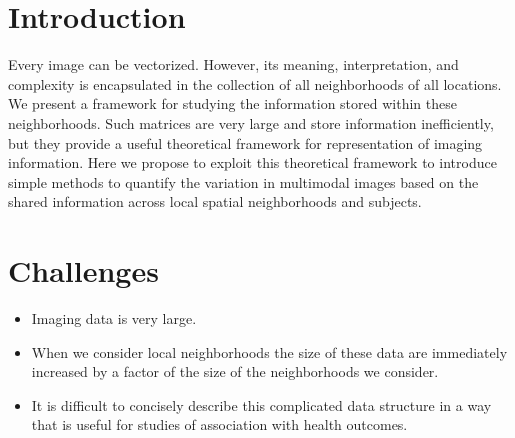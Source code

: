 \documentclass[a0,landscape]{a0poster}
\begin{document}
\begin{multicols}{3}
\color{black} %
\large{\section*{\color{uwred}Introduction}}
\noindent Every image can be vectorized. However, its meaning, interpretation, and complexity is encapsulated in the collection of all neighborhoods of all locations. We present a framework for studying the information stored within these neighborhoods. Such  matrices are very large and store information inefficiently, but they provide a useful theoretical framework for representation of imaging information. Here we propose to exploit this theoretical framework to introduce simple methods to quantify the variation in multimodal images based on the shared information across local spatial neighborhoods and subjects.
{\section*{\color{uwred}Challenges}}
\begin{itemize}
\item  Imaging data is very large.
\item When we consider local neighborhoods the size of these data are immediately increased by a factor of the size of the neighborhoods we consider.
\item It is difficult to concisely describe this complicated data structure in a way that is useful for studies of association with health outcomes.
\end{itemize}



\end{multicols}
\end{document}

